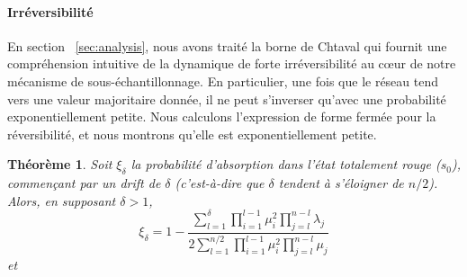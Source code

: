 \documentclass[a4,twocolumn,10pt]{article}
\newcommand\ddfrac[2]{\frac{\displaystyle #1}{\displaystyle #2}}
\newtheorem{theorem}{Théorème}
\theoremstyle{definition}
\begin{document}
\begin{appendices}
\paragraph{Irréversibilité}
En section ~\ref{sec:analysis}, nous avons traité la borne de Chtaval qui fournit une compréhension intuitive de la dynamique de forte irréversibilité au cœur de notre mécanisme de sous-échantillonnage. En particulier, une fois que le réseau tend vers une valeur majoritaire donnée, il ne peut s'inverser qu'avec une probabilité exponentiellement petite. Nous calculons l'expression de forme fermée pour la réversibilité, et nous montrons qu'elle est exponentiellement petite.
\begin{theorem}
\label{theorem:slush_prob_convergence_minority}
Soit $\xi_\delta$ la probabilité d'absorption dans l'état totalement rouge ($s_0$), commençant par un drift de $\delta$ (c'est-à-dire que $\delta$ tendent à s'éloigner de $n/2$). Alors, en supposant $\delta > 1$,
\begin{equation}
\xi_\delta = 1 - \ddfrac{\sum_{l = 1}^{\delta} \prod_{i = 1}^{l-1} \mu_i^2 \prod_{j = l}^{n-l}\lambda_j}{2\sum_{l = 1}^{n/2}\prod_{i=1}^{l-1}\mu_i^2\prod_{j=l}^{n-l}\mu_j}
\end{equation}
et
\begin{equation}
\begin{split}

\end{split}
\end{equation}
\end{theorem}
\end{appendices}
\end{document}
